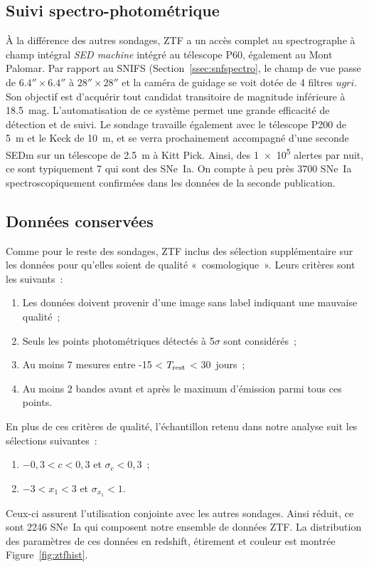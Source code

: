 \documentclass[../main/main.tex]{subfiles}
\begin{document}
\subsection{Suivi spectro-photométrique}\label{ssec:ztfspectro}

À la différence des autres sondages, ZTF a un accès complet au spectrographe à
champ intégral \textit{SED machine} \citep[SEDm, voir][]{blagorodnova2018,
rigault2019} intégré au télescope P60, également au Mont Palomar. Par rapport au
SNIFS (Section~\ref{ssec:snfspectro}, le champ de vue passe de
$\ang{;;6.4}\times\ang{;;6.4}$ à $\ang{;;28}\times\ang{;;28}$ et la caméra de
guidage se voit dotée de 4 filtres $ugri$. Son objectif est d'acquérir tout
candidat transitoire de magnitude inférieure à \SI{18.5}{mag}. L'automatisation
de ce système permet une grande efficacité de détection et de suivi. Le sondage
travaille également avec le télescope P200 de \SI{5}{m} et le Keck de
\SI{10}{m}, et se verra prochainement accompagné d'une seconde SEDm sur un
télescope de \SI{2.5}{m} à Kitt Pick. Ainsi, des \num{1e5} alertes par nuit, ce
sont typiquement 7 qui sont des SNe~Ia. On compte à peu près 3700 SNe~Ia
spectroscopiquement confirmées dans les données de la seconde publication.

\subsection{Données conservées}\label{ssec:ztfdata}

Comme pour le reste des sondages, ZTF inclus des sélection supplémentaire sur
les données pour qu'elles soient de qualité «~cosmologique~». Leurs critères
sont les suivants~:
\begin{enumerate}
    \item Les données doivent provenir d'une image sans label indiquant une
        mauvaise qualité~;
    \item Seuls les points photométriques détectés à 5$\sigma$ sont considérés~;
    \item Au moins 7 mesures entre -15 < $T_{\rm rest}$ < \SI{30}{jours}~;
    \item Au moins 2 bandes avant et après le maximum d'émission parmi tous ces
        points.
\end{enumerate}
En plus de ces critères de qualité, l'échantillon retenu dans notre analyse suit
les sélections suivantes~:
\begin{enumerate}[resume]
    \item $-0,3 < c < 0,3$ et $\sigma_{c} < 0,3$~;
    \item $-3 < x_1 < 3$ et $\sigma_{x_1} < 1$.
\end{enumerate}
Ceux-ci assurent l'utilisation conjointe avec les autres sondages. Ainsi réduit,
ce sont 2246 SNe~Ia qui composent notre ensemble de données ZTF. La distribution
des paramètres de ces données en redshift, étirement et couleur est montrée
Figure~\ref{fig:ztfhist}.
\end{document}

